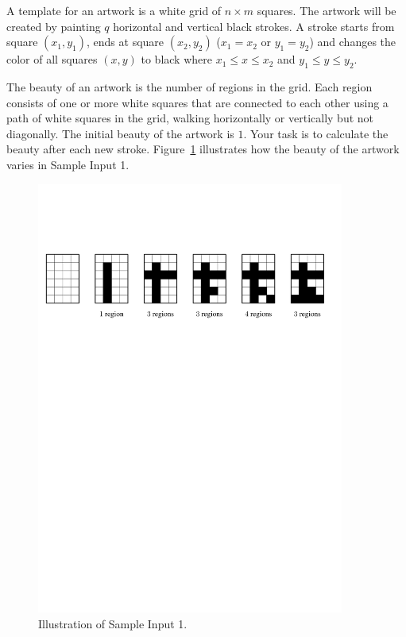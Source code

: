 
A template for an artwork is a white grid of $n \times m$ squares.
The artwork will be created by painting $q$ horizontal and vertical black strokes.
A stroke starts from square $(x_1,y_1)$, ends at square $(x_2,y_2)$
($x_1=x_2$ or $y_1=y_2$) and changes the color of all squares $(x,y)$ to black
where $x_1 \le x \le x_2$ and $y_1 \le y \le y_2$.

The beauty of an artwork is the number of regions in the grid.
Each region consists of one or more white squares that are connected
to each other using a path of white squares in the grid, walking horizontally or vertically but not diagonally.
The initial beauty of the artwork is $1$. Your task is to calculate the
beauty after each new stroke.  Figure~\ref{fig:modern art sample} illustrates how the beauty of the artwork varies in Sample Input 1.

\begin{figure}[!h]
\centering
\includegraphics[width=0.9\textwidth]{sample}
\caption{Illustration of Sample Input 1.}
\label{fig:modern art sample}
\end{figure}

